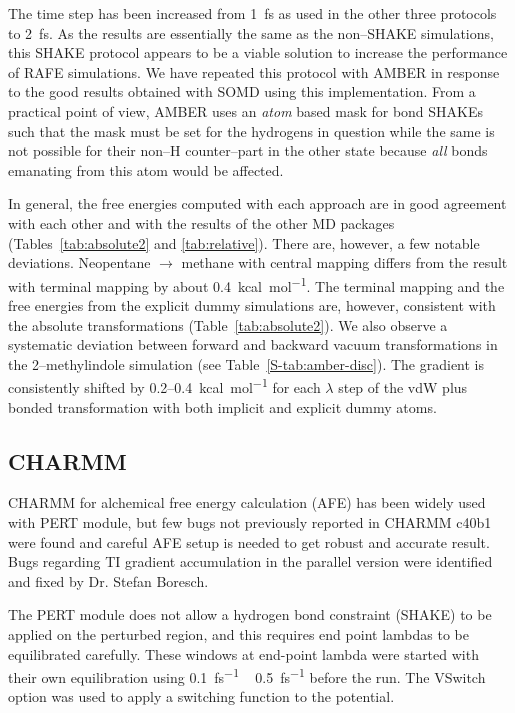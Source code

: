 \documentclass[journal=jctcce,manuscript=article]{achemso}
\begin{document}
The time step has been increased from \SI{1}{fs} as used in the other
three protocols to \SI{2}{fs}.  As the results are essentially the same as the
non--SHAKE simulations, this SHAKE protocol appears to be a viable solution to
increase the performance of RAFE simulations.  We have repeated this protocol
with AMBER in response to the good results obtained with SOMD using this
implementation.  From a practical point of view, AMBER uses an \emph{atom}
based mask for bond SHAKEs such that the mask must be set for the hydrogens in
question while the same is not possible for their non--H counter--part in the
other state because \emph{all} bonds emanating from this atom would be affected.

In general, the free energies computed with each approach are in good agreement
with each other and with the results of the other MD packages
(Tables~\ref{tab:absolute2} and \ref{tab:relative}).  There are, however, a few
notable deviations.  Neopentane $\rightarrow$ methane with central mapping
differs from the result with terminal mapping by about
\SI{0.4}{kcal.mol^{-1}}.  The terminal mapping and the free energies from the
explicit dummy simulations are, however, consistent with the absolute
transformations (Table~\ref{tab:absolute2}).  We also observe a systematic
deviation between forward and backward vacuum transformations in the
2--methylindole simulation (see Table~\ref{S-tab:amber-disc}).  The gradient
is consistently shifted by 0.2--\SI{0.4}{kcal.mol^{-1}} for each $\lambda$ step
of the vdW plus bonded transformation with both implicit and explicit dummy
atoms.


\subsection{CHARMM}
\label{sec:charmm-results}

CHARMM for alchemical free energy calculation (AFE) has been widely used with PERT module, but few bugs not previously reported in CHARMM c40b1 were found and careful AFE setup is needed to get robust and accurate result. Bugs regarding TI gradient accumulation in the parallel version were identified and fixed by Dr. Stefan Boresch.

The PERT module does not allow a hydrogen bond constraint (SHAKE) to be applied on the perturbed region, and this requires end point lambdas to be equilibrated
carefully. These windows at end-point lambda were started with their own equilibration using \SI{0.1}{fs^{-1}} ~ \SI{0.5}{fs^{-1}} before the run. The VSwitch option was used to apply a switching function to the potential.
\end{document}
